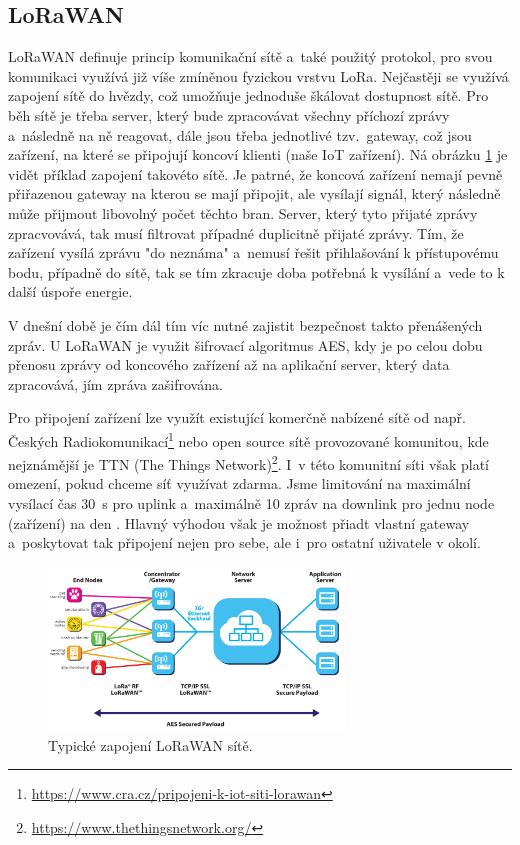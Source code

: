 \subsection{LoRaWAN}

LoRaWAN definuje princip komunikační sítě a~také použitý protokol, pro svou komunikaci využívá již víše zmíněnou fyzickou vrstvu LoRa. Nejčastěji se využívá zapojení sítě do hvězdy, což umožňuje jednoduše škálovat dostupnost sítě. Pro běh sítě je třeba server, který bude zpracovávat všechny příchozí zprávy a~následně na ně reagovat, dále jsou třeba jednotlivé tzv.~gateway, což jsou zařízení, na které se připojují koncoví klienti (naše IoT zařízení). Ná obrázku \ref{fig_LoRaWANNetwork} je vidět příklad zapojení takovéto sítě. Je patrné, že koncová zařízení nemají pevně přiřazenou gateway na kterou se mají připojit, ale vysílají signál, který následně může přijmout libovolný počet těchto bran. Server, který tyto přijaté zprávy zpracvovává, tak musí filtrovat případné duplicitně přijaté zprávy. Tím, že zařízení vysílá zprávu "do neznáma" a~nemusí řešit přihlašování k přístupovému bodu, případně do sítě, tak se tím zkracuje doba potřebná k vysílání a~vede to k další úspoře energie.

V dnešní době je čím dál tím víc nutné zajistit bezpečnost takto přenášených zpráv. U LoRaWAN je využit šifrovací algoritmus AES, kdy je po celou dobu přenosu zprávy od koncového zařízení až na aplikační server, který data zpracovává, jím zpráva zašifrována.

Pro připojení zařízení lze využít existující komerčně nabízené sítě od např. Českých Radiokomunikací\footnote{\url{https://www.cra.cz/pripojeni-k-iot-siti-lorawan}} nebo open source sítě provozované komunitou, kde nejznámější je TTN (The Things Network)\footnote{\url{https://www.thethingsnetwork.org/}}. I~v této komunitní síti však platí omezení, pokud chceme síť využívat zdarma. Jsme limitování na maximální vysílací čas \SI{30}{\second} pro uplink a~maximálně 10 zpráv na downlink pro jednu node (zařízení) na den \cite{TTN_fair_use}. Hlavný výhodou však je možnost přiadt vlastní gateway a~poskytovat tak připojení nejen pro sebe, ale i~pro ostatní uživatele v okolí.

\begin{figure}
    \centering
    \includegraphics[width=0.7\textwidth]{obrazky/lorawanNetwork.png}
    \caption{Typické zapojení LoRaWAN sítě. \cite{LoRaWAN_pdf}}
    \label{fig_LoRaWANNetwork}
\end{figure}

